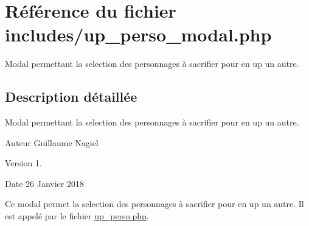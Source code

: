 \hypertarget{up__perso__modal_8php}{}\section{Référence du fichier includes/up\+\_\+perso\+\_\+modal.php}
\label{up__perso__modal_8php}


Modal permettant la selection des personnages à sacrifier pour en up un autre.  




\subsection{Description détaillée}
Modal permettant la selection des personnages à sacrifier pour en up un autre. 

\begin{DoxyAuthor}{Auteur}
Guillaume Nagiel 
\end{DoxyAuthor}
\begin{DoxyVersion}{Version}
1. 
\end{DoxyVersion}
\begin{DoxyDate}{Date}
26 Janvier 2018
\end{DoxyDate}
Ce modal permet la selection des personnages à sacrifier pour en up un autre. Il est appelé par le fichier \mbox{\hyperlink{up__perso_8php}{up\+\_\+perso.\+php}}. 